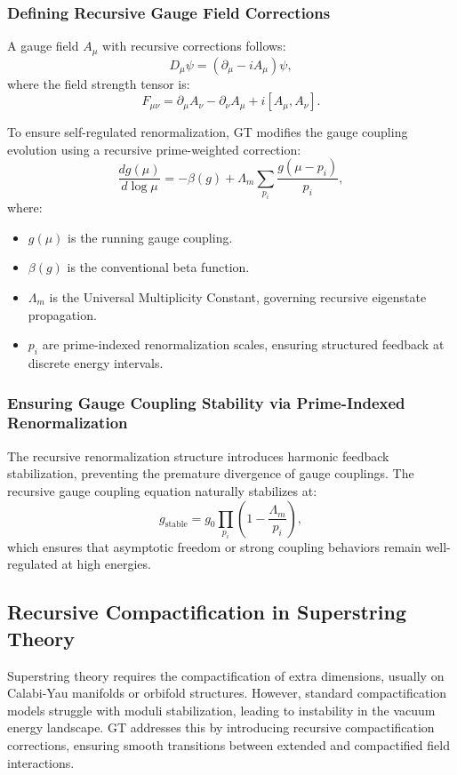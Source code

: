 \documentclass{article}
\theoremstyle{plain}
\begin{document}
\subsubsection{Defining Recursive Gauge Field Corrections}
A gauge field $A_{\mu}$ with recursive corrections follows:
\begin{equation}
D_{\mu} \psi = (\partial_{\mu} - i A_{\mu}) \psi,
\end{equation}
where the field strength tensor is:
\begin{equation}
F_{\mu\nu} = \partial_{\mu} A_{\nu} - \partial_{\nu} A_{\mu} + i [A_{\mu}, A_{\nu}].
\end{equation}

To ensure self-regulated renormalization, GT modifies the gauge coupling evolution using a recursive prime-weighted correction:
\begin{equation}
\frac{d g(\mu)}{d \log \mu} = -\beta(g) + \Lambda_m \sum_{p_i} \frac{g(\mu - p_i)}{p_i},
\end{equation}
where:
\begin{itemize}
\item $g(\mu)$ is the running gauge coupling.
\item $\beta(g)$ is the conventional beta function.
\item $\Lambda_m$ is the Universal Multiplicity Constant, governing recursive eigenstate propagation.
\item $p_i$ are prime-indexed renormalization scales, ensuring structured feedback at discrete energy intervals.
\end{itemize}

\subsubsection{Ensuring Gauge Coupling Stability via Prime-Indexed Renormalization}
The recursive renormalization structure introduces harmonic feedback stabilization, preventing the premature divergence of gauge couplings. The recursive gauge coupling equation naturally stabilizes at:
\begin{equation}
g_{\text{stable}} = g_0 \prod_{p_i} \left( 1 - \frac{\Lambda_m}{p_i} \right),
\end{equation}
which ensures that asymptotic freedom or strong coupling behaviors remain well-regulated at high energies.

\subsection{Recursive Compactification in Superstring Theory}
Superstring theory requires the compactification of extra dimensions, usually on Calabi-Yau manifolds or orbifold structures. However, standard compactification models struggle with moduli stabilization, leading to instability in the vacuum energy landscape. GT addresses this by introducing recursive compactification corrections, ensuring smooth transitions between extended and compactified field interactions.
\end{document}
